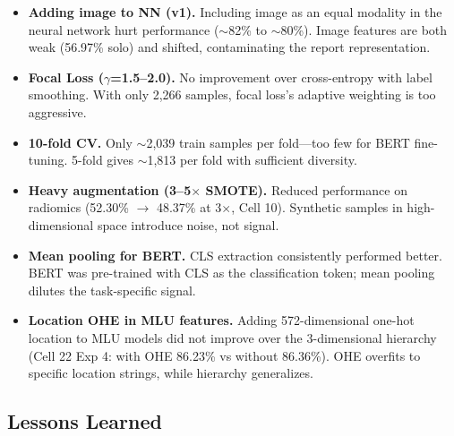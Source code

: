 \begin{itemize}
  \item \textbf{Adding image to NN (v1).} Including image as an equal modality in the neural network hurt performance ($\sim$82\% to $\sim$80\%). Image features are both weak (56.97\% solo) and shifted, contaminating the report representation.
  \item \textbf{Focal Loss ($\gamma$=1.5--2.0).} No improvement over cross-entropy with label smoothing. With only 2,266 samples, focal loss's adaptive weighting is too aggressive.
  \item \textbf{10-fold CV.} Only $\sim$2,039 train samples per fold---too few for BERT fine-tuning. 5-fold gives $\sim$1,813 per fold with sufficient diversity.
  \item \textbf{Heavy augmentation (3--5$\times$ SMOTE).} Reduced performance on radiomics (52.30\% $\to$ 48.37\% at 3$\times$, Cell 10). Synthetic samples in high-dimensional space introduce noise, not signal.
  \item \textbf{Mean pooling for BERT.} CLS extraction consistently performed better. BERT was pre-trained with CLS as the classification token; mean pooling dilutes the task-specific signal.
  \item \textbf{Location OHE in MLU features.} Adding 572-dimensional one-hot location to MLU models did not improve over the 3-dimensional hierarchy (Cell 22 Exp 4: with OHE 86.23\% vs without 86.36\%). OHE overfits to specific location strings, while hierarchy generalizes.
\end{itemize}

\subsection{Lessons Learned}

